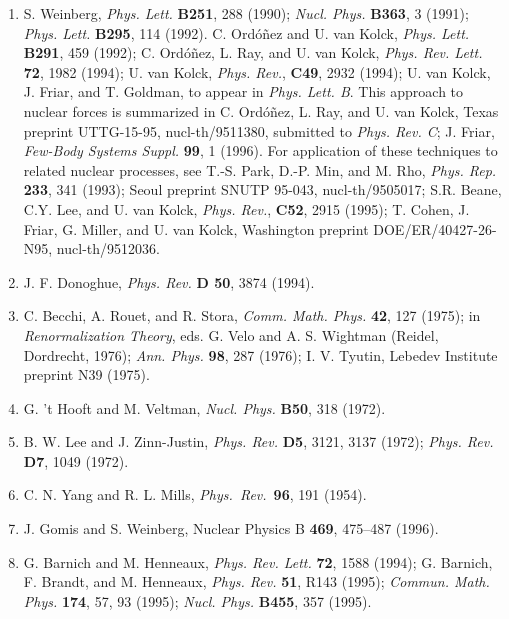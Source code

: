 \begin{enumerate}
\item S. Weinberg, {\em Phys. Lett.} {\bf B251}, 288 (1990);
{\em Nucl. Phys.} {\bf B363}, 3 (1991);  {\em Phys. Lett.}
{\bf B295}, 114 (1992).  C. Ord\'o\~nez and U. van Kolck,
{\em Phys. Lett.} {\bf B291}, 459 (1992); C. Ord\'o\~nez, L.
Ray, and U. van Kolck, {\em Phys. Rev. Lett.} {\bf 72}, 1982
(1994); U. van Kolck, {\em Phys. Rev.}, {\bf C49}, 2932
(1994); U. van Kolck, J. Friar, and T. Goldman, to appear in
{\em Phys. Lett. B}.   This approach to nuclear forces is
summarized in C. Ord\'o\~nez, L. Ray, and U. van Kolck,
Texas preprint UTTG-15-95, nucl-th/9511380, submitted to
{\em Phys. Rev. C}; J. Friar,
{\em Few-Body Systems Suppl.} {\bf 99}, 1 (1996).   For
application of these techniques to related nuclear
processes, see T.-S. Park, D.-P. Min, and M. Rho, {\em Phys.
Rep.} {\bf 233}, 341 (1993); Seoul preprint SNUTP 95-043,
nucl-th/9505017; S.R. Beane, C.Y. Lee, and U. van Kolck,
{\em Phys. Rev.}, {\bf C52}, 2915 (1995); T. Cohen, J.
Friar, G. Miller, and U. van Kolck, Washington preprint
DOE/ER/40427-26-N95, nucl-th/9512036.

\item J. F. Donoghue, {\it Phys. Rev.} {\bf D 50}, 3874
(1994).

\item C. Becchi, A. Rouet, and R. Stora, {\it Comm. Math.
Phys.} {\bf 42}, 127 (1975); in {\em Renormalization
Theory}, eds. G. Velo and A. S. Wightman (Reidel, Dordrecht,
1976); {\it Ann. Phys.} {\bf 98}, 287 (1976); I. V. Tyutin,
Lebedev Institute preprint N39 (1975).

\item G. 't Hooft and M. Veltman, {\it Nucl.
Phys.} {\bf B50}, 318 (1972).

\item B. W. Lee and J. Zinn-Justin, {\it Phys.
Rev.} {\bf D5}, 3121, 3137 (1972); {\it Phys. Rev.} {\bf
D7}, 1049 (1972).

\item C. N. Yang and R. L. Mills, {\it Phys.~Rev.}~{\bf 96},
191 (1954).

\item J. Gomis and S. Weinberg, Nuclear Physics B {\bf 469},
475--487 (1996).

\item G. Barnich and M. Henneaux,
{\em Phys. Rev. Lett.} {\bf 72}, 1588 (1994); G. Barnich, F.
Brandt,  and M. Henneaux, {\em Phys. Rev.} {\bf 51}, R143
(1995); {\em Commun. Math. Phys.} {\bf 174}, 57, 93 (1995);
{\em Nucl. Phys.} {\bf B455}, 357 (1995).



\end{enumerate}
